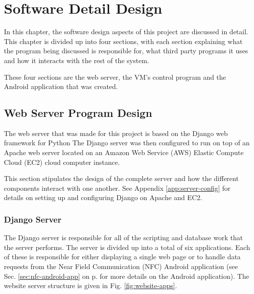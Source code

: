 \chapter{Software Detail Design}
\label{chap:4}

In this chapter, the software design aspects of this project are discussed in
detail. This chapter is divided up into four sections, with each section explaining what
the program being discussed is responsible for, what third party programs it
uses and how it interacts with the rest of the system. 

These four sections are the web server, the VM's control program and the Android
application that was created.

\section{Web Server Program Design}

The web server that was made for this project is based on the Django web framework for Python
The Django server was then configured to run on top of
an Apache web server located on an Amazon Web Service (AWS) Elastic Compute
Cloud (EC2) cloud computer instance.

This section stipulates the design of the complete server and how the different
components interact with one another. See Appendix \ref{app:server-config} for details on
setting up and configuring Django on Apache and EC2.

\subsection{Django Server}

The Django server is responsible for all of the scripting and database work
that the server performs. The server is divided up into a total of six
applications. Each of these is responsible for either displaying a single web
page or to handle data requests from the Near Field Communication (NFC) Android
application (see Sec. \ref{sec:nfc-android-app} on p.\pageref{sec:nfc-android-app}
for more details on the Android application). The website server structure is given
in Fig. \ref{fig:website-apps}.

